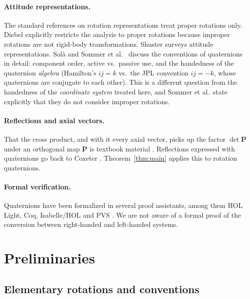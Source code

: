 \documentclass{article}
\theoremstyle{plain}
\theoremstyle{definition}
\newcommand{\vect}[1]{\boldsymbol{#1}}
\begin{document}
\paragraph{Attitude representations.} The standard references on rotation representations treat
proper rotations only. Diebel \cite{diebel2006} explicitly restricts the analysis to proper
rotations because improper rotations are not rigid-body transformations. Shuster
\cite{shuster1993} surveys attitude representations. Sol\`a \cite{sola2017} and Sommer
et al.\ \cite{sommer2018} discuss the conventions of quaternions in detail: component order,
active vs.\ passive use, and the handedness of the quaternion \emph{algebra} (Hamilton's
$ij = k$ vs.\ the JPL convention $ij = -k$, whose quaternions are conjugate to each other). This
is a different question from the handedness of the \emph{coordinate system} treated here, and
Sommer et al.\ state explicitly that they do not consider improper rotations.

\paragraph{Reflections and axial vectors.} That the cross product, and with it every axial vector,
picks up the factor $\det \vect P$ under an orthogonal map $\vect P$ is textbook material
\cite{haber}. Reflections expressed with quaternions go back to Coxeter \cite{coxeter1946}.
Theorem~\ref{thm:main} applies this to rotation quaternions.

\paragraph{Formal verification.} Quaternions have been formalized in several proof assistants,
among them HOL Light, Coq, Isabelle/HOL and PVS \cite{itp2024}. We are not aware of a formal proof
of the conversion between right-handed and left-handed systems.

\section{Preliminaries}\label{sec:prelim}

\subsection{Elementary rotations and conventions}
\end{document}
